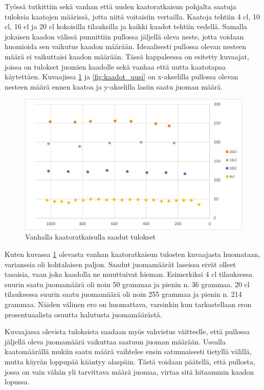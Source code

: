 Työssä tutkittiin sekä vanhan että uuden kaatoratkaisun pohjalta saatuja tuloksia kaatojen määrissä, jotta niitä voitaisiin vertailla. Kaatoja tehtiin 4 cl, 10 cl, 16 cl ja 20 cl kokoisilla tilauksilla ja kaikki kaadot tehtiin vedellä. Samalla jokaisen kaadon välissä punnittiin pullossa jäljellä oleva neste, jotta voidaan huomioida sen vaikutus kaadon määrään. Ideaalisesti pullossa olevan nesteen määrä ei vaikuttaisi kaadon määrään. Tässä kappaleessa on esitetty kuvaajat, joissa on tulokset juomien kaadolle sekä vanhaa että uutta kaatotapaa käytettäen. Kuvaajissa \ref{fig:kaadot_vanha} ja \ref{fig:kaadot_uusi} on x-akselilla pullossa olevan nesteen määrä ennen kaatoa ja y-akselilla lasiin saatu juoman määrä.

\begin{figure}[h]
\begin{center}
\includegraphics[scale=0.25]{img/kaadot_vanha.pdf}
\end{center}
\caption{Vanhalla kaatoratkaisulla saadut tulokset}
\label{fig:kaadot_vanha}
\end{figure}

Kuten kuvassa \ref{fig:kaadot_vanha} olevasta vanhan kaatoratkaisun tulosten kuvaajasta huomataan, varianssia oli kohtalaisen paljon. Saadut juomamäärät laseissa eivät olleet tasaisia, vaan joka kaadolla ne muuttuivat hieman. Esimerkiksi 4 cl tilauksessa suurin saatu juomamäärä oli noin 50 grammaa ja pienin n. 36 grammaa. 20 cl tilauksessa suurin saatu juomamäärä oli noin 255 grammaa ja pienin n. 214 grammaa. Näiden välinen ero on huomattava, varsinkin kun tarkastellaan eron prosentuaalista osuutta halutusta juomamäärästä.

Kuvaajassa olevista tuloksista saadaan myös vahvistus väitteelle, että pullossa jäljellä oleva juomamäärä vaikuttaa saatuun juoman määrään. Usealla kaatomäärällä mukiin saatu määrä vaihtelee ensin satunnaisesti tietyllä välillä, mutta käyrän loppupää kääntyy alaspäin. Tästä voidaan päätellä, että pullosta, jossa on vain vähän yli tarvittava määrä juomaa, virtaa sitä hitaammin kaadon lopussa.

